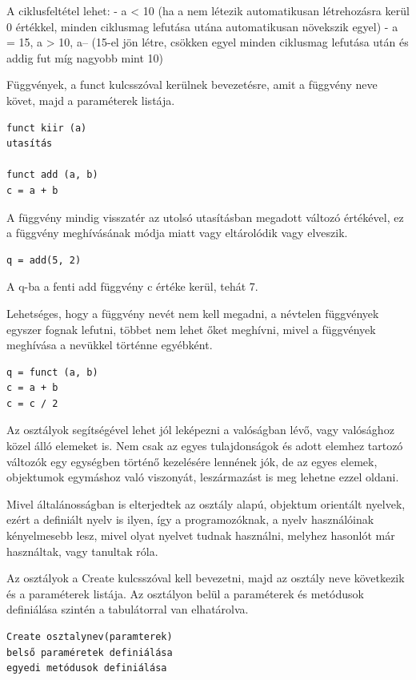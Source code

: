A ciklusfeltétel lehet:
- a < 10 (ha a nem létezik automatikusan létrehozásra kerül 0 értékkel, minden ciklusmag lefutása utána automatikusan növekszik egyel)
- a = 15, a > 10, a-- (15-el jön létre, csökken egyel minden ciklusmag lefutása után és addig fut míg nagyobb mint 10)

Függvények, a funct kulcsszóval kerülnek bevezetésre, amit a függvény neve követ, majd a paraméterek listája.

\begin{verbatim}
funct kiir (a)
utasítás

funct add (a, b)
c = a + b
\end{verbatim}

A függvény mindig visszatér az utolsó utasításban megadott változó értékével, ez a függvény meghívásának módja miatt vagy eltárolódik vagy elveszik.

\begin{verbatim}
q = add(5, 2)
\end{verbatim}

A q-ba a fenti add függvény c értéke kerül, tehát 7.

Lehetséges, hogy a függvény nevét nem kell megadni, a névtelen függvények egyszer fognak lefutni, többet nem lehet őket meghívni, mivel a függvények meghívása a nevükkel történne egyébként.

\begin{verbatim}
q = funct (a, b)
c = a + b
c = c / 2
\end{verbatim}

Az osztályok segítségével lehet jól leképezni a valóságban lévő, vagy valósághoz közel álló elemeket is. Nem csak az egyes tulajdonságok és adott elemhez tartozó változók egy egységben történő kezelésére lennének jók, de az egyes elemek, objektumok egymáshoz való viszonyát, leszármazást is meg lehetne ezzel oldani.

Mivel általánosságban is elterjedtek az osztály alapú, objektum orientált nyelvek, ezért a definiált nyelv is ilyen, így a programozóknak, a nyelv használóinak kényelmesebb lesz, mivel olyat nyelvet tudnak használni, melyhez hasonlót már használtak, vagy tanultak róla.

Az osztályok a Create kulcsszóval kell bevezetni, majd az osztály neve következik és a paraméterek listája. Az osztályon belül a paraméterek és metódusok definiálása szintén a tabulátorral van elhatárolva.

\begin{verbatim}
Create osztalynev(paramterek)
belső paraméretek definiálása
egyedi metódusok definiálása
\end{verbatim}


